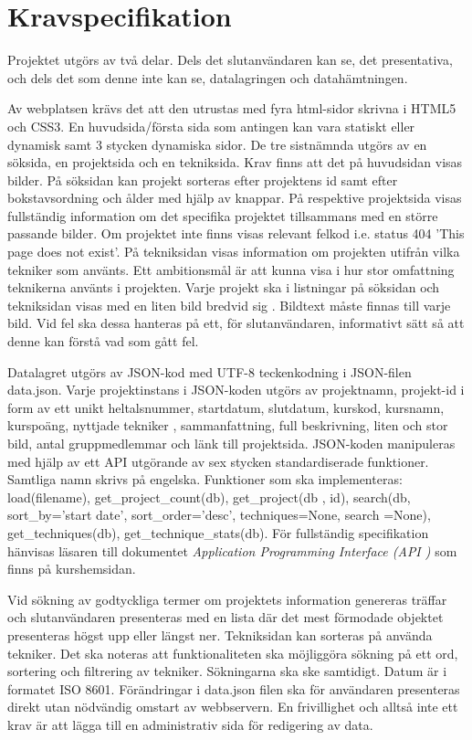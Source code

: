 \documentclass{TDP003mall}
\begin{document}
\newpage

\section{Kravspecifikation}
Projektet utgörs av två delar. Dels det slutanvändaren kan se, det presentativa,
och dels det som denne inte kan se, datalagringen och datahämtningen.

Av webplatsen krävs det att den utrustas med fyra html-sidor skrivna i HTML5 och
 CSS3. En huvudsida/första sida som antingen kan vara statiskt eller dynamisk samt
 3 stycken dynamiska sidor. De tre sistnämnda utgörs av en söksida, en projektsida
 och en tekniksida. Krav finns att det på huvudsidan visas bilder. På söksidan kan
 projekt sorteras efter projektens id samt efter bokstavsordning och ålder med hjälp av knappar.
 På respektive projektsida visas fullständig information om det specifika
 projektet tillsammans med en större passande bilder. Om projektet inte finns visas
 relevant felkod i.e. status 404 'This page does not exist'. På tekniksidan visas
 information om projekten utifrån vilka tekniker som använts. Ett ambitionsmål är
 att kunna visa i hur stor omfattning teknikerna använts i projekten. Varje projekt
 ska i listningar på söksidan och tekniksidan visas med en liten bild bredvid sig
. Bildtext måste finnas till varje bild. Vid fel ska dessa hanteras på ett, för 
slutanvändaren, informativt sätt så att denne kan förstå vad som gått fel.

Datalagret utgörs av JSON-kod med UTF-8 teckenkodning i JSON-filen data.json. Varje
 projektinstans i JSON-koden utgörs av projektnamn, projekt-id i form av ett unikt
 heltalsnummer, startdatum, slutdatum, kurskod, kursnamn, kurspoäng, nyttjade tekniker
, sammanfattning, full beskrivning, liten och stor bild, antal gruppmedlemmar och
 länk till projektsida. JSON-koden manipuleras med hjälp av ett API utgörande av
 sex stycken standardiserade funktioner. Samtliga namn skrivs på engelska. Funktioner
 som ska implementeras: load(filename), get\_project\_count(db), get\_project(db
, id), search(db, sort\_by='start date', sort\_order='desc', techniques=None, search
=None), get\_techniques(db), get\_technique\_stats(db). För fullständig specifikation
 hänvisas läsaren till dokumentet \textit{Application Programming Interface (API
)} som finns på kurshemsidan.

Vid sökning av godtyckliga termer om projektets information genereras träffar och
 slutanvändaren presenteras med en lista där det mest förmodade objektet presenteras
 högst upp eller längst ner. Tekniksidan kan sorteras på använda tekniker. Det ska
 noteras att funktionaliteten ska möjliggöra sökning på ett ord, sortering och filtrering
 av tekniker. Sökningarna ska ske samtidigt. Datum är i formatet ISO 8601. Förändringar
 i data.json filen ska för användaren presenteras direkt utan nödvändig omstart av
 webbservern. En frivillighet och alltså inte ett krav är att lägga till en administrativ
 sida för redigering av data.
\end{document}
